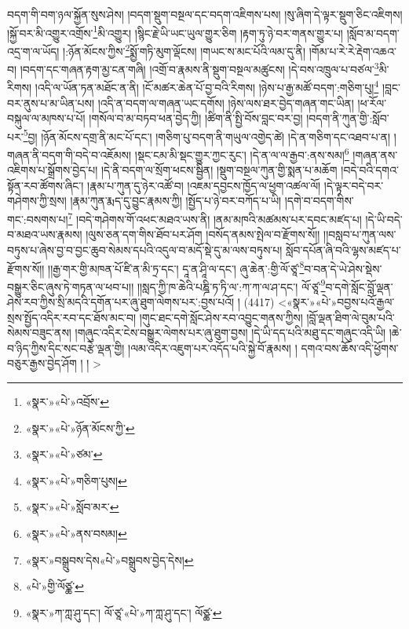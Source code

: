 བདག་གི་བག་ཉལ་སྐྱོན་སུས་ཤེས། །བདག་སྡུག་བསྔལ་དང་བདག་འཇིགས་པས། །སུ་ཞིག་དེ་ལྟར་སྡུག་ཅིང་འཇིགས། །སྐྱོ་བར་མི་འགྱུར་འགྲོས་\footnote{«སྣར་»«པེ་»འབྲོས་}མི་འགྱུར། །སྙིང་རྗེ་ཡི་ཡང་ཡུལ་གྱུར་ཅིག །རྟག་ཏུ་ཉེ་བར་གནས་གྱུར་པ། །སློབ་མ་བདག་འདྲ་ག་ལ་ཡོད། །:ཉོན་མོངས་ཀྱིས་\footnote{«སྣར་»«པེ་»ཉོན་མོངས་ཀྱི་}སྨྱོ་གཏི་མུག་ལྡོངས། །གཡང་ས་མང་པོའི་ལམ་དུ་ནི། །གོམ་པ་རེ་རེ་རྡེག་འཆའ་བ། །བདག་དང་གཞན་རྟག་མྱ་ངན་གཞི། །འགྲོ་བ་རྣམས་ནི་སྡུག་བསྔལ་མཚུངས། །དེ་བས་འཁྲུལ་པ་བཙལ་\footnote{«སྣར་»«པེ་»ཙམ་}མི་རིགས། །འདི་ལ་ཡོན་ཏན་མཐོང་ན་ནི། །ངོ་མཚར་ཆེན་པོ་བྱ་བའི་རིགས། །ཉེས་པ་རྒྱ་མཚོ་བདག་:གཅིག་པུ།\footnote{«སྣར་»«པེ་»གཅིག་པུས།} །བླང་བར་ནུས་པ་མ་ཡིན་པས། །འདི་ན་བདག་ལ་གཞན་ཡང་དགོས། །ཉེས་ལས་ཐར་བྱེད་གཞན་གང་ཡིན། །ཕ་རོལ་བསྐུལ་ལ་མཁས་པ་པོ། །གསོལ་བ་མ་བཏབ་ཕན་བྱེད་ཀྱི། །ཚིག་ནི་སྤྱི་བོས་བླང་བར་བྱ། །བདག་ནི་ཀུན་གྱི་:སློབ་པར་\footnote{«སྣར་»«པེ་»སློབ་མར་}བྱ། །ཉོན་མོངས་དགྲ་ནི་མང་པོ་དང་། །གཅིག་པུ་བདག་ནི་གཡུལ་འགྱེད་ཚེ། །དེ་ན་གཅིག་དང་འཐབ་པ་ན། །གཞན་ནི་བདག་གི་བདེ་བ་འཇོམས། །སྡང་ངམ་མི་སྡང་གྱུར་ཀྱང་རུང་། །དེ་ན་ལ་ལ་རྒྱབ་:ནས་སམ།\footnote{«སྣར་»«པེ་»ནས་བསམ།} །གཞན་ནས་འཇིགས་པ་སྒྲོགས་བྱེད་པ། །དེ་ནི་བདག་ལ་སྲོག་ཕངས་སྦྱིན། །སྡུག་བསྔལ་ཀུན་གྱི་སྨན་པ་མཆོག །བདེ་བའི་དགའ་སྟོན་རབ་ཚོགས་ཞིང་། །རྣམ་པ་ཀུན་དུ་ཉེར་འཚོ་བ། །འཇམ་དབྱངས་ཁྱོད་ལ་ཕྱག་འཚལ་ལོ། །དེ་ལྟར་བདེ་བར་གཤེགས་ཀྱི་སྲས། །རྣམ་ཀུན་རྨད་དུ་བྱུང་རྣམས་ཀྱི། །སྤྱོད་པ་ཉེ་བར་བཀོད་པ་ཡི། །དགེ་བ་བདག་གིས་གང་:བསགས་པ།\footnote{«སྣར་»བསྒྲུབས་དེས«པེ་»བསྒྲུབས་བྱེད་དེས།} །བདེ་གཤེགས་གོ་འཕང་མཐའ་ཡས་ནི། །ནམ་མཁའི་མཚམས་པར་དབང་མཛད་པ། །དེ་ཡི་བདེ་བ་མཐའ་ཡས་རྣམས། །ལུས་ཅན་དག་གིས་ཐོབ་པར་ཤོག །བསོད་ནམས་སྤེལ་བ་རྫོགས་སོ།། །།བསླབ་པ་ཀུན་ལས་བཏུས་པ་ཞེས་བྱ་བ་བྱང་ཆུབ་སེམས་དཔའི་འདུལ་བ་མདོ་སྡེ་དུ་མ་ལས་བཏུས་པ། སློབ་དཔོན་ཞི་བའི་ལྷས་མཛད་པ་རྫོགས་སོ།། །།རྒྱ་གར་གྱི་མཁན་པོ་ཛི་ན་མི་ཏྲ་དང་། དཱ་ན་ཤཱི་ལ་དང་། ཞུ་ཆེན་:གྱི་ལོ་ཙཱ་\footnote{«པེ་»གྱི་ལོཙྪ་}བ་བན་དེ་ཡེ་ཤེས་སྡེས་བསྒྱུར་ཅིང་ཞུས་ཏེ་གཏན་ལ་ཕབ་པ།། །།སླད་ཀྱི་ཁ་ཆེའི་པཎྜི་ཏ་ཏི་ལ་:ཀ་ཀ་ལ་ཤ་དང་། ལོ་ཙཱ་\footnote{«སྣར་»ཀ་ཀླ་ཤུ་དང་། ལོ་ཙཱ་«པེ་»ཀ་ཀླ་ཤུ་དང་། ལོཙྪ་}བ་དགེ་སློང་བློ་ལྡན་ཤེས་རབ་ཀྱིས་སྲི་མདའི་དགོན་པར་ཞུ་ཐུག་ལེགས་པར་:བྱས་པའོ། ། (4417) <«སྣར་»«པེ་»བབྱས་པའོ་རྒྱལ་སྲས་སྤྱོད་འདིར་རབ་དང་ཐོས་མང་བ། །གུང་ཐང་དགེ་སློང་ཤེས་རབ་འབྱུང་གནས་ཀྱིས། །བློ་ལྡན་ཐིག་ལེ་བུམ་པའི་སེམས་བཟུང་ནས། །གཞུང་འདིར་ངེས་བསྒྱུར་ལེགས་པར་ཞུ་ཐུག་བྱས། །དེ་ཡི་དད་པའི་མཐུ་དང་གཞུང་འདི་ཡི། །ཆེ་བ་ཉིད་ཀྱིས་དིང་སང་བརྩེ་ལྡན་གྱི། །ལམ་འདིར་འཇུག་པར་འདོད་པའི་སྐྱེ་བོ་རྣམས། །
དགའ་བས་ཆོས་འདི་ཕྱོགས་བཅུར་རྒྱས་བྱེད་ཤོག ། ། >